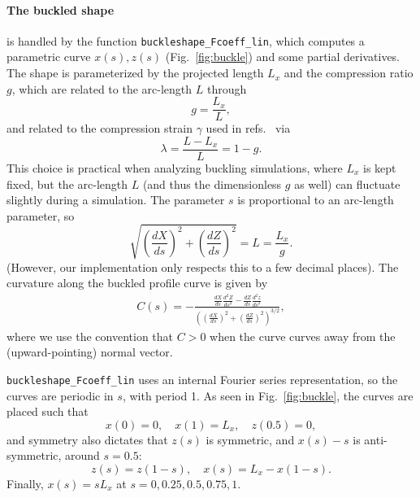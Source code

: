 \documentclass[11pt,a4paper,twocolumn]{article}
\begin{document}
\paragraph{The buckled shape}
is handled by the function \texttt{buckleshape\_Fcoeff\_lin}, which
computes a parametric curve $x(s),z(s)$ (Fig.~\ref{fig:buckle}) and
some partial derivatives. The shape is parameterized by the projected
length $L_x$ and the compression ratio $g$, which are related to the
arc-length $L$ through
\begin{equation}
  g=\frac{L_x}{L},
\end{equation}
and related to the compression strain $\gamma$ used in
refs.~\cite{gomez2016,hu2013} via
\begin{equation}
  \lambda=\frac{L-L_x}{L}=1-g.
\end{equation}
This choice is practical when analyzing buckling simulations, where
$L_x$ is kept fixed, but the arc-length $L$ (and thus the dimensionless
$g$ as well) can fluctuate slightly during a simulation. The parameter
$s$ is proportional to an arc-length parameter, so 
\begin{equation}
  \sqrt{\left(\frac{dX}{ds}\right)^2+\left(\frac{dZ}{ds}\right)^2}
  =L=\frac{L_x}{g}.
\end{equation}
(However, our implementation only respects this to a few decimal
places). The curvature along the buckled profile curve is given by
\begin{multline}
  C(s)=-\frac{\frac{dX}{ds}\frac{d^2Z}{ds^2}-\frac{dZ}{ds}\frac{d^2z}{ds^2}}{
    \left(
    \left(\frac{dX}{ds}\right)^2+\left(\frac{dZ}{ds}\right)^2
    \right)^{3/2}},
\end{multline}
where we use the convention that $C>0$ when the curve curves away from
the (upward-pointing) normal vector.

\texttt{buckleshape\_Fcoeff\_lin} uses an internal Fourier series
representation, so the curves are periodic in $s$, with period 1. As
seen in Fig.~\ref{fig:buckle}, the curves are placed such that
\begin{equation}
x(0)=0,\quad
x(1)=L_x,\quad 
z(0.5)=0,
\end{equation}
and symmetry also dictates that $z(s)$ is symmetric, 
and $x(s)-s$ is anti-symmetric,  around $s=0.5$:
\begin{equation}
  z(s)=z(1-s),\quad
  x(s)=L_x-x(1-s).
\end{equation}
Finally, $x(s)=sL_x$ at $s=0,0.25,0.5,0.75,1$.
\end{document}

